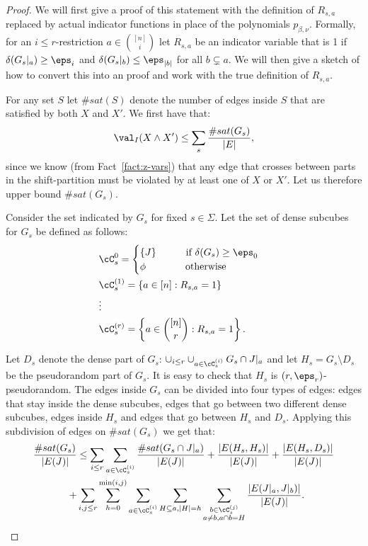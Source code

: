 \begin{proof}
We will first give a proof of this statement with the definition of $R_{s,a}$ replaced by actual indicator functions in place of the polynomials $p_{\beta,\nu}$. Formally, for an $i \leq r$-restriction $a \in {[n] \choose i}$ let $R_{s,a}$ be an indicator variable that is 1 if $\delta(G_s|_a) \geq \eps_i$ and $\delta(G_s|_b) \leq \eps_{|b|}$ for all $b \subsetneq a$. We will then give a sketch of how to convert this into an \sos proof and work with the true definition of $R_{s,a}$.

For any set $S$ let $\#sat(S)$ denote the number of edges inside $S$ that are satisfied by both $X$ and $X'$. We first have that:
\begin{equation}\label{eq:edge_cover0}
\val_{I}(X \wedge X') \leq \sum_s \frac{\#sat(G_s)}{|E|},
\end{equation}
since we know (from Fact~\ref{fact:z-vars}) that any edge that crosses between parts in the shift-partition must be violated by at least one of $X$ or $X'$. Let us therefore upper bound $\#sat(G_s)$.


Consider the set indicated by $G_s$ for fixed $s \in \Sigma$. Let the set of dense subcubes for $G_s$ be defined as follows:
\begin{align*}
&\cC^0_s = \begin{cases}\{J\} ~~~~~~~~~\text{if $\delta(G_s) \geq \eps_0$} \\
\phi ~~~~~~~~~~~~\text{otherwise}
\end{cases} \\
&\cC^{(1)}_s = \left\{a \in [n]: R_{s,a} = 1\right\} \\
&\vdots \\
&\cC^{(r)}_s = \left\{a \in {[n] \choose r}: R_{s,a} = 1\right\}. 
\end{align*}


Let $D_s$ denote the dense part of $G_s$: $\cup_{i \leq r} \cup_{a \in \cC^{(i)}_s} G_s \cap J|_a$ and let $H_s = G_s \setminus D_s$ be the pseudorandom part of $G_s$. It is easy to check that $H_s$ is $(r, \eps_r)$-pseudorandom. The edges inside $G_s$ can be divided into four types of edges: edges that stay inside the dense subcubes, edges that go between two different dense subcubes, edges inside $H_s$ and edges that go between $H_s$ and $D_s$. Applying this subdivision of edges on $\#sat(G_s)$ we get that:
\begin{align}
\frac{\#sat(G_s)}{|E(J)|} 
&\leq \sum_{i \leq r} \sum_{a \in \cC^{(i)}_s} \frac{\#sat(G_s \cap J|_a)}{|E(J)|}  +
\frac{|E(H_s, H_s)|}{|E(J)|} + \frac{|E(H_s, D_s)|}{|E(J)|}\notag\\\label{eq:edge-cov1}
+ 
&\sum_{i, j \leq r} 
\sum\limits_{h=0}^{\min(i,j)}
\sum_{a \in \cC^{(i)}_s}
\sum_{H\subseteq a, |H| = h}
\sum_{\substack{b \in \cC^{(j)}_s \\ a \neq b, a\cap b = H}} \frac{|E(J|_a, J|_b)|}{|E(J)|}.
\end{align}


\end{proof}
